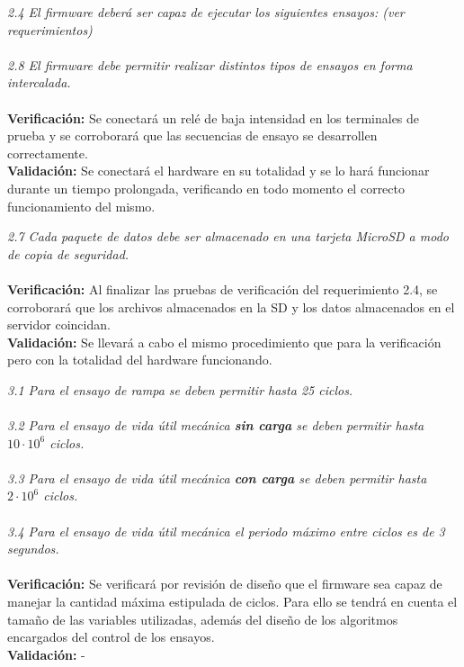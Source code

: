 \documentclass[11pt]{charter}
\begin{document}
\begin{tcolorbox}
	\textit{2.4 El firmware deberá ser capaz de ejecutar los siguientes ensayos: (ver requerimientos)} \\ \\
	\textit{2.8 El firmware debe permitir realizar distintos tipos de ensayos en forma intercalada.} \\ \\
	\textbf{Verificación:} Se conectará un relé de baja intensidad en los terminales de prueba y se corroborará que las secuencias de ensayo se desarrollen correctamente. \\
	\textbf{Validación:} Se conectará el hardware en su totalidad y se lo hará funcionar durante un tiempo prolongada, verificando en todo momento el correcto funcionamiento del mismo. \\
\end{tcolorbox}

\begin{tcolorbox}
	\textit{2.7 Cada paquete de datos debe ser almacenado en una tarjeta MicroSD a modo de copia de seguridad.} \\ \\
	\textbf{Verificación:} Al finalizar las pruebas de verificación del requerimiento 2.4, se corroborará que los archivos almacenados en la SD y los datos almacenados en el servidor coincidan. \\
	\textbf{Validación:} Se llevará a cabo el mismo procedimiento que para la verificación pero con la totalidad del hardware funcionando. \\
\end{tcolorbox}

\begin{tcolorbox}
	\textit{3.1 Para el ensayo de rampa se deben permitir hasta 25 ciclos.} \\ \\	
	\textit{3.2 Para el ensayo de vida útil mecánica \textbf{sin carga} se deben permitir hasta $10 \cdot 10^6$ ciclos.} \\ \\
	\textit{3.3 Para el ensayo de vida útil mecánica \textbf{con carga} se deben permitir hasta $2 \cdot 10^6$ ciclos.} \\ \\
	\textit{3.4 Para el ensayo de vida útil mecánica el periodo máximo entre ciclos es de 3 segundos.} \\ \\
	\textbf{Verificación:} Se verificará por revisión de diseño que el firmware sea capaz de manejar la cantidad máxima estipulada de ciclos. Para ello se tendrá en cuenta el tamaño de las variables utilizadas, además del diseño de los algoritmos encargados del control de los ensayos. \\
	\textbf{Validación:} - \\
\end{tcolorbox}
\end{document}
